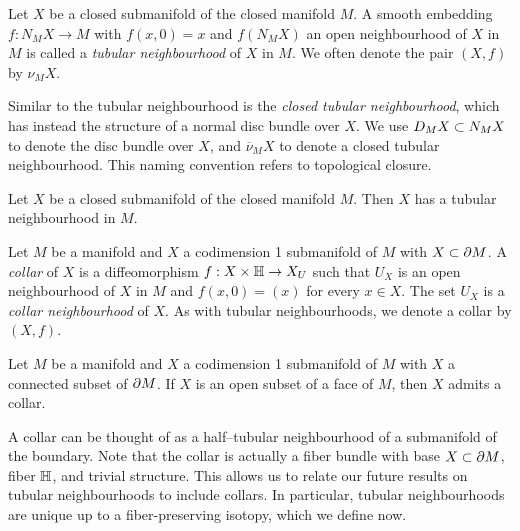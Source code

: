 \begin{defn}
	\label{def:tubularneighbourhood}
	Let $X$ be a closed submanifold of the closed manifold $M$.
	A smooth embedding $f:N_M X\to M$ with $f(x,0)=x$ and $f(N_M X)$ an open neighbourhood of $X$ in $M$ is called a \emph{tubular neighbourhood} of $X$ in $M$.
	We often denote the pair $(X,f)$ by $\nu_M X$.
\end{defn}

Similar to the tubular neighbourhood is the \emph{closed tubular neighbourhood}, which has instead the structure of a normal disc bundle over $X$.
We use $D_M X\subset N_M X$ to denote the disc bundle over $X$, and $\overline{\nu}_M X$ to denote a closed tubular neighbourhood.
This naming convention refers to topological closure.

\begin{theorem}
	\label{thm:tubularneighbourhood}
	Let $X$ be a closed submanifold of the closed manifold $M$.
	Then $X$ has a tubular neighbourhood in $M$.
\end{theorem}

\begin{defn}
	\label{defthm:collar}
	Let $M$ be a manifold and $X$ a codimension 1 submanifold of $M$ with $X\subset \partial M$.
	A \emph{collar} of $X$ is a diffeomorphism $f: X\times \mathbb{H}\to X_U$ such that $U_X$ is an open neighbourhood of $X$ in $M$ and $f(x,0)=(x)$ for every $x\in X$.
	The set $U_X$ is a \emph{collar neighbourhood} of $X$.
	As with tubular neighbourhoods, we denote a collar by $(X,f)$.
\end{defn}

\begin{prop}
	Let $M$ be a manifold and $X$ a codimension 1 submanifold of $M$ with $X$ a connected subset of $\partial M$.
	If $X$ is an open subset of a face of $M$, then $X$ admits a collar.
\end{prop}

A collar can be thought of as a half--tubular neighbourhood of a submanifold of the boundary.
Note that the collar is actually a fiber bundle with base $X\subset \partial M$, fiber $\mathbb{H}$, and trivial structure.
This allows us to relate our future results on tubular neighbourhoods to include collars.
In particular, tubular neighbourhoods are unique up to a fiber-preserving isotopy, which we define now.

